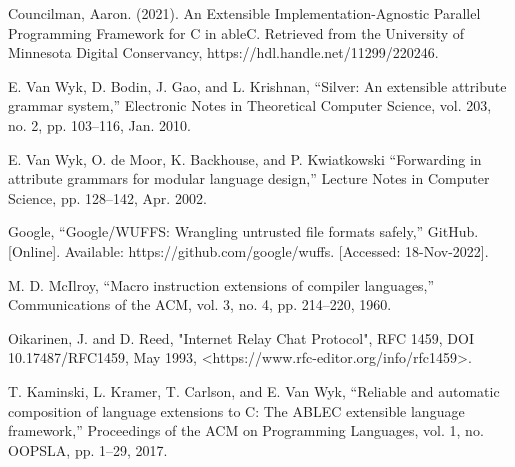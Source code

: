 \documentclass[12pt]{article}
\begin{document}




\newpage

\hypersetup{hidelinks}
\tableofcontents

\newpage


\newpage

\newpage

\newpage

\newpage

\newpage

\newpage
\begin{thebibliography}{99}
		Councilman, Aaron. (2021). An Extensible Implementation-Agnostic Parallel Programming Framework for C in ableC. Retrieved from the University of
		Minnesota Digital Conservancy, https://hdl.handle.net/11299/220246.

        E. Van Wyk, D. Bodin, J. Gao, and L. Krishnan, “Silver: An extensible 
        attribute grammar system,” Electronic Notes in Theoretical Computer 
        Science, vol. 203, no. 2, pp. 103–116, Jan. 2010. 

		E. Van Wyk, O. de Moor, K. Backhouse, and P. Kwiatkowski “Forwarding in 
        attribute grammars for modular language design,” Lecture Notes in 
        Computer Science, pp. 128–142, Apr. 2002.
    
        Google, “Google/WUFFS: Wrangling untrusted file formats safely,” GitHub. 
        [Online]. Available: https://github.com/google/wuffs. [Accessed: 
        18-Nov-2022]. 
	
		M. D. McIlroy, “Macro instruction extensions of compiler languages,” 
        Communications of the ACM, vol. 3, no. 4, pp. 214–220, 1960. 
	
	    Oikarinen, J. and D. Reed, "Internet Relay Chat Protocol", RFC 1459, DOI 
        10.17487/RFC1459, May 1993, <https://www.rfc-editor.org/info/rfc1459>.
		
	    T. Kaminski, L. Kramer, T. Carlson, and E. Van Wyk, “Reliable and 
        automatic composition of language extensions to C: The ABLEC extensible 
        language framework,” Proceedings of the ACM on Programming Languages, 
        vol. 1, no. OOPSLA, pp. 1–29, 2017. 
\end{thebibliography}
\end{document}
